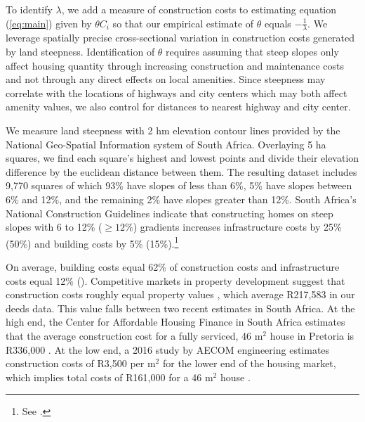 \documentclass[12pt]{article}
\begin{document}
To identify $\lambda$, we add a measure of construction costs to estimating equation (\ref{eq:main}) given by $\theta C_i$ so that our empirical estimate of $\theta$ equals $-\frac{1}{\lambda}$.  We leverage spatially precise cross-sectional variation in construction costs generated by land steepness.  Identification of $\theta$ requires assuming that steep slopes only affect housing quantity through increasing construction and maintenance costs and not through any direct effects on local amenities.  Since steepness may correlate with the locations of highways and city centers which may both affect amenity values, we also control for distances to nearest highway and city center.

We measure land steepness with 2 hm elevation contour lines provided by the National Geo-Spatial Information system of South Africa.  Overlaying 5 ha squares, we find each square's highest and lowest points and divide their elevation difference by the euclidean distance between them.  The resulting dataset includes 9,770 squares of which 93\% have slopes of less than 6\%, 5\% have slopes between 6\% and 12\%, and the remaining 2\% have slopes greater than 12\%.  South Africa's National Construction Guidelines indicate that constructing homes on steep slopes with 6 to 12\% ($\geq12\%$) gradients increases infrastructure costs by 25\% (50\%) and building costs by 5\% (15\%).\footnote{See \cite{redbook}.}  

On average, building costs equal 62\% of construction costs and infrastructure costs equal 12\% (\cite{cahfcosts}).  Competitive markets in property development suggest that construction costs roughly equal property values \citep{cahfcosts}, which average R217,583 in our deeds data.  This value falls between two recent estimates in South Africa.  At the high end, the Center for Affordable Housing Finance in South Africa estimates that the average construction cost for a fully serviced, 46 $\text{m}^{2}$ house  in Pretoria is R336,000 \citep{cahfcosts}.  At the low end, a 2016 study by AECOM engineering estimates construction costs of R3,500 per $\text{m}^{2}$ for the lower end of the housing market, which implies total costs of R161,000 for a 46 $\text{m}^{2}$ house \citep{aecom}.
\end{document}
